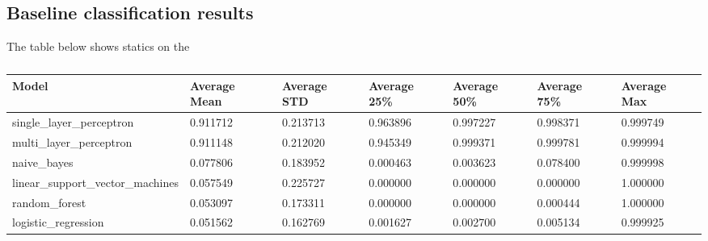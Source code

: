 \documentclass[epsfig,a4paper,11pt,titlepage,twoside,openany]{book}
\begin{document}
\subsection{Baseline classification results}
\label{sec:apx-baseline-classification-results}

The table below shows statics on the 

\begin{table}[H]
\centering
\begin{tabular}{|l|l|l|l|ll|l|}
\hline
Model                             & Average Mean & Average STD & Average 25\% & Average 50\% & Average 75\% & Average Max \\ \hline
single\_layer\_perceptron         & 0.911712     & 0.213713    & 0.963896     & 0.997227     & 0.998371     & 0.999749    \\
multi\_layer\_perceptron          & 0.911148     & 0.212020    & 0.945349     & 0.999371     & 0.999781     & 0.999994    \\
naive\_bayes                      & 0.077806     & 0.183952    & 0.000463     & 0.003623     & 0.078400     & 0.999998    \\
linear\_support\_vector\_machines & 0.057549     & 0.225727    & 0.000000     & 0.000000     & 0.000000     & 1.000000    \\
random\_forest                    & 0.053097     & 0.173311    & 0.000000     & 0.000000     & 0.000444     & 1.000000    \\
logistic\_regression              & 0.051562     & 0.162769    & 0.001627     & 0.002700     & 0.005134     & 0.999925    \\ \hline
\end{tabular}
\caption{}
\label{tab:my-table}
\end{table}
\end{document}
